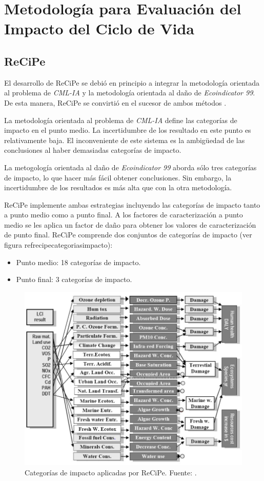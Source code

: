 \section{Metodología para Evaluación del Impacto del Ciclo de Vida}
\subsection{ReCiPe}\label{sec:recipe}

El desarrollo de ReCiPe se debió en principio a integrar la metodología orientada al problema de \textit{CML-IA} y la metodología orientada al daño de \textit{Ecoindicator 99}. De esta manera, ReCiPe se convirtió en el sucesor de ambos métodos \cite{mgoedkoop3}.

La metodología orientada al problema de \textit{CML-IA} define las categorías de impacto en el punto medio. La incertidumbre de los resultado en este punto es relativamente baja. El inconveniente de este sistema es la ambigüedad de las conclusiones al haber demasiadas categorías de impacto.

La metogología orientada al daño de \textit{Ecoindicator 99} aborda sólo tres categorías de impacto, lo que hacer más fácil obtener conclusiones. Sin embargo, la incertidumbre de los resultados es más alta que con la otra metodología.

ReCiPe implemente ambas estrategias incluyendo las categorías de impacto tanto a punto medio como a punto final. A los factores de caracterización a punto medio se les aplica un factor de daño para obtener los valores de caracterización de punto final. ReCiPe comprende dos conjuntos de categorías de impacto (ver figura ref{recipecategoriasimpacto}):
\begin{itemize}
\item Punto medio: 18 categorías de impacto.
\item Punto final: 3 categorías de impacto.
\end{itemize}

\begin{figure}[!htb]
\centering
\includegraphics[width=12cm]{recipecategoriasimpacto.png}
\caption[Categorías de impacto aplicadas por ReCiPe.]{Categorías de impacto aplicadas por ReCiPe. Fuente: \protect\cite{mgoedkoop3}.}
\label{fig:recipecategoriasimpacto}
\end{figure}

